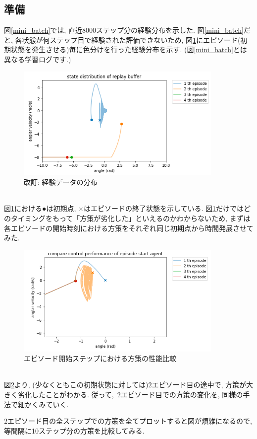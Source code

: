 \documentclass{jsarticle}
\begin{document}
\subsection{準備}
図\ref{mini_batch}では, 直近8000ステップ分の経験分布を示した. 図\ref{mini_batch}だと, 各状態が何ステップ目で経験された評価できないため, 図\ref{mini_batch_r}にエピソード(初期状態を発生させる)毎に色分けを行った経験分布を示す. (図\ref{mini_batch}とは異なる学習ログです.)
\begin{figure}[h]
	\centering
 	\includegraphics[width=10cm]{mini_batch_r.png}
 	\caption{改訂: 経験データの分布} \label{mini_batch_r}
\end{figure}\\
図\ref{mini_batch_r}における●は初期点, ×はエピソードの終了状態を示している. 図\ref{mini_batch_r}だけではどのタイミングをもって「方策が劣化した」といえるのかわからないため, まずは各エピソードの開始時刻における方策をそれぞれ同じ初期点から時間発展させてみた. 
\begin{figure}[h]
	\centering
 	\includegraphics[width=10cm]{compare_episode_agent.png}
 	\caption{エピソード開始ステップにおける方策の性能比較} \label{cea}
\end{figure}\\
図\ref{cea}より, (少なくともこの初期状態に対しては)$2$エピソード目の途中で, 方策が大きく劣化したことがわかる. 従って,~$2$エピソード目での方策の変化を, 同様の手法で細かくみていく.\par
$2$エピソード目の全ステップでの方策を全てプロットすると図が煩雑になるので, 等間隔に10ステップ分の方策を比較してみる. 
\end{document}
